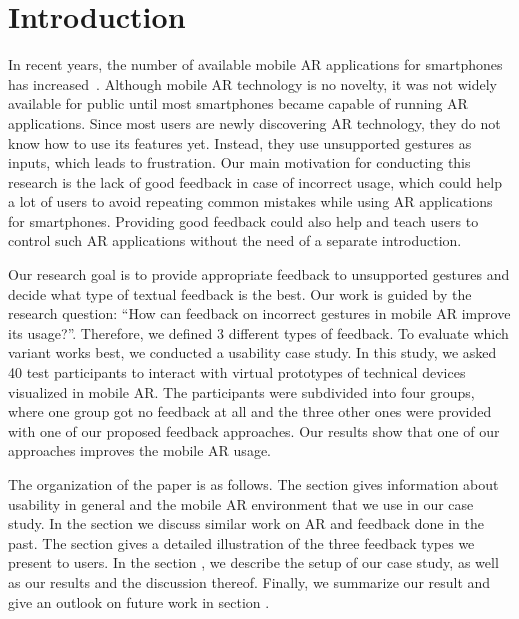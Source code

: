 \documentclass[manuscript]{acmart}
\begin{document}
	\maketitle
	\pagebreak
	\section{Introduction}\label{sec:introduction}
		In recent years, the number of available mobile \ac{AR} applications for smartphones has increased~\citep{Tractica2017}. Although mobile \ac{AR} technology is no novelty, it was not widely available for public until most smartphones became capable of running \ac{AR} applications. Since most users are newly discovering \ac{AR} technology, they do not know how to use its features yet. Instead, they use unsupported gestures as inputs, which leads to frustration. Our main motivation for conducting this research is the lack of good feedback in case of incorrect usage, which could help a lot of users to avoid repeating common mistakes while using \ac{AR} applications for smartphones. Providing good feedback could also help and teach users to control such \ac{AR} applications without the need of a separate introduction.

		Our research goal is to provide appropriate feedback to unsupported gestures and decide what type of textual feedback is the best. Our work is guided by the research question: ``How can feedback on incorrect gestures in mobile AR improve its usage?''. Therefore, we defined 3 different types of feedback. To evaluate which variant works best, we conducted a usability case study. In this study, we asked 40 test participants to interact with virtual prototypes of technical devices visualized in mobile \ac{AR}. The participants were subdivided into four groups, where one group got no feedback at all and the three other ones were provided with one of our proposed feedback approaches. Our results show that one of our approaches improves the mobile \ac{AR} usage.

		The organization of the paper is as follows. The section \emph{} gives information about usability in general and the mobile \ac{AR} environment that we use in our case study. In the section \emph{} we discuss similar work on \ac{AR} and feedback done in the past. The \emph{} section gives a detailed illustration of the three feedback types we present to users. In the section \emph{}, we describe the setup of our case study, as well as our results and the discussion thereof. Finally, we summarize our result and give an outlook on future work in section \emph{}.
\end{document}
